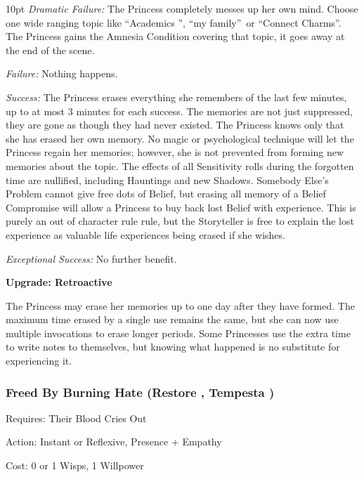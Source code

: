 \begin{myindentpar}{10pt}    \emph{Dramatic Failure:} The Princess completely messes up her own mind. Choose one wide ranging topic like \textquotedblleft Academics \textquotedblright , \textquotedblleft my family\textquotedblright\, or \textquotedblleft Connect Charms\textquotedblright . The Princess gains the Amnesia Condition covering that topic, it goes away at the end of the scene.

    \emph{Failure:} Nothing happens.

    \emph{Success:} The Princess erases everything she remembers of the last few minutes, up to at most 3 minutes for each success. The memories are not just suppressed, they are gone as though they had never existed. The Princess knows only that she has erased her own memory. No magic or psychological technique will let the Princess regain her memories; however, she is not prevented from forming new memories about the topic.
    The effects of all Sensitivity rolls during the forgotten time are nullified, including Hauntings and new Shadows. Somebody Else's Problem cannot give free dots of Belief, but erasing all memory of a Belief Compromise will allow a Princess to buy back lost Belief with experience. This is purely an out of character rule rule, but the Storyteller is free to explain the lost experience as valuable life experiences being erased if she wishes.

    \emph{Exceptional Success:} No further benefit.

\textbf{Upgrade: Retroactive}

The Princess may erase her memories up to one day after they have formed. The maximum time erased by a single use remains the same, but she can now use multiple invocations to erase longer periods. Some Princesses use the extra time to write notes to themselves, but knowing what happened is no substitute for experiencing it.\end{myindentpar}

\subsubsection*{Freed By Burning Hate (Restore \textbullet\textbullet\textbullet, Tempesta \textbullet\textbullet\textbullet)}

\noindent Requires: Their Blood Cries Out

\noindent Action: Instant or Reflexive, Presence + Empathy

\noindent Cost: 0 or 1 Wisps, 1 Willpower

